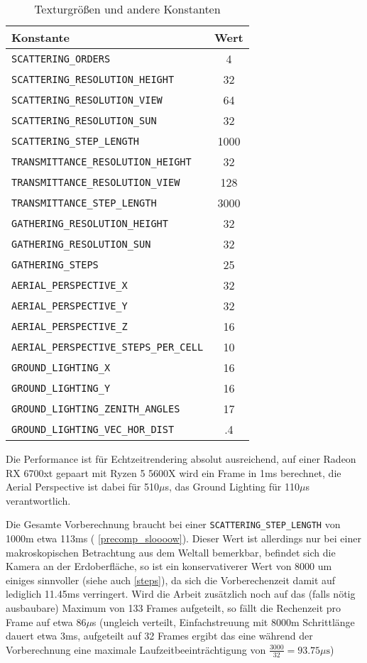\begin{table}
	\centering
	\begin{tabular}{| l | c |}
	\hline
	Konstante & Wert\\ \hline
	\texttt{SCATTERING\_ORDERS} & 4 \\
	\texttt{SCATTERING\_RESOLUTION\_HEIGHT} & 32 \\
	\texttt{SCATTERING\_RESOLUTION\_VIEW} & 64 \\
	\texttt{SCATTERING\_RESOLUTION\_SUN} & 32 \\
	\texttt{SCATTERING\_STEP\_LENGTH} & 1000 \\ \hline
	\texttt{TRANSMITTANCE\_RESOLUTION\_HEIGHT} & 32 \\
	\texttt{TRANSMITTANCE\_RESOLUTION\_VIEW} & 128 \\
	\texttt{TRANSMITTANCE\_STEP\_LENGTH} & 3000 \\ \hline
	\texttt{GATHERING\_RESOLUTION\_HEIGHT} & 32 \\
	\texttt{GATHERING\_RESOLUTION\_SUN} & 32 \\
	\texttt{GATHERING\_STEPS} & 25 \\ \hline
	\texttt{AERIAL\_PERSPECTIVE\_X} & 32 \\
	\texttt{AERIAL\_PERSPECTIVE\_Y} & 32 \\
	\texttt{AERIAL\_PERSPECTIVE\_Z} & 16 \\
	\texttt{AERIAL\_PERSPECTIVE\_STEPS\_PER\_CELL} & 10 \\ \hline
	\texttt{GROUND\_LIGHTING\_X} & 16 \\
	\texttt{GROUND\_LIGHTING\_Y} & 16 \\
	\texttt{GROUND\_LIGHTING\_ZENITH\_ANGLES} & 17 \\
	\texttt{GROUND\_LIGHTING\_VEC\_HOR\_DIST} & .4 \\ \hline
	\end{tabular}
\caption{Texturgrößen und andere Konstanten}
\label{consts}
\end{table}

Die Performance ist für Echtzeitrendering absolut ausreichend, auf einer Radeon RX 6700xt gepaart mit Ryzen 5 5600X wird
ein Frame in 1ms berechnet, die Aerial Perspective ist dabei für 510$\mu$s, das Ground Lighting für 110$\mu$s
verantwortlich.

Die Gesamte Vorberechnung braucht bei einer \texttt{SCATTERING\_STEP\_LENGTH} von 1000m etwa 113ms (
\cref{precomp_sloooow}). Dieser Wert ist allerdings nur bei einer makroskopischen Betrachtung aus dem Weltall bemerkbar,
befindet sich die Kamera an der Erdoberfläche, so ist ein konservativerer Wert von 8000 um einiges sinnvoller (siehe
auch \cref{steps}), da sich die Vorberechenzeit damit auf lediglich 11.45ms verringert. Wird die Arbeit zusätzlich noch
auf das (falls nötig ausbaubare) Maximum von 133 Frames aufgeteilt, so fällt die Rechenzeit pro Frame auf etwa 86$\mu$s
(ungleich verteilt, Einfachstreuung mit 8000m Schrittlänge dauert etwa 3ms, aufgeteilt auf 32 Frames ergibt das eine
während der Vorberechnung eine maximale Laufzeitbeeinträchtigung von $\frac{3000}{32}=93.75\mu\text{s}$)


